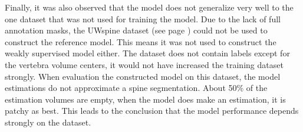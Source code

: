 \par{
Finally, it was also observed that the model does not generalize very well to the one dataset that was not used for training the model.
Due to the lack of full annotation masks, the UWspine dataset (see page \pageref{sec:UWspine}) could not be used to construct the reference model.
This means it was not used to construct the weakly supervised model either. 
The dataset does not contain labels except for the vertebra volume centers, it would not have increased the training dataset strongly.
When evaluation the constructed model on this dataset, the model estimations do not approximate a spine segmentation.
About 50\% of the estimation volumes are empty, when the model does make an estimation, it is patchy as best.
This leads to the conclusion that the model performance depends strongly on the dataset. 
}



